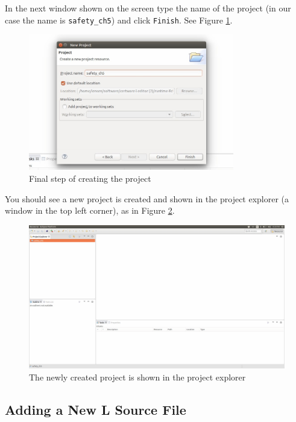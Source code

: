 \documentclass[a4paper,10pt]{article}
\begin{document}
\noindent
In the next window shown on the screen type the name of the project (in our case the name is 
\texttt{safety\_ch5}) and click  \texttt{Finish}. See Figure \ref{fig3}.

\begin{figure}[h!]
\centering
\includegraphics[width=0.8\textwidth]{3}
\caption{Final step of creating the project}\label{fig3}
\end{figure}

\noindent
You should see a new project is created and shown in the project explorer (a window in the top left corner), as in Figure \ref{fig4}.

\begin{figure}[h!]
\centering
\includegraphics[width=1.0\textwidth]{4}
\caption{The newly created project is shown in the project explorer}\label{fig4}
\end{figure}






\subsection{Adding a New L Source File}
\end{document}
